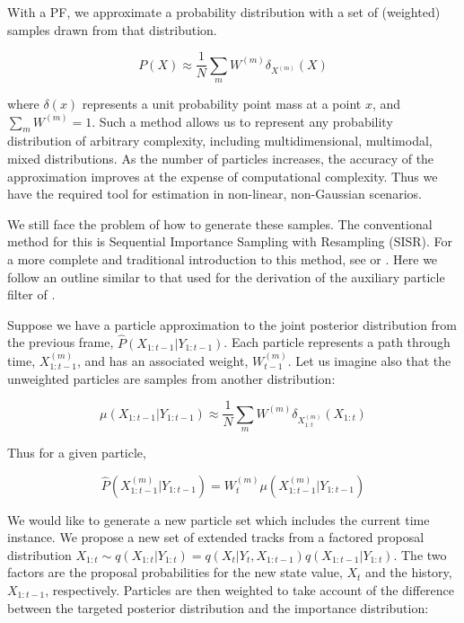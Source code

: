 With a PF, we approximate a probability distribution with a set of (weighted) samples drawn from that distribution.

\begin{equation}
P(X) \approx \frac{1}{N} \sum_m{W^{(m)} \delta_{X^{(m)}} (X)}
\label{eq:ParticleApprox}
\end{equation}

where $\delta (x)$ represents a unit probability point mass at a point $x$, and $\sum_m{W^{(m)}}=1$. Such a method allows us to represent any probability distribution of arbitrary complexity, including multidimensional, multimodal, mixed distributions. As the number of particles increases, the accuracy of the approximation improves at the expense of computational complexity. Thus we have the required tool for estimation in non-linear, non-Gaussian scenarios.

We still face the problem of how to generate these samples. The conventional method for this is Sequential Importance Sampling with Resampling (SISR). For a more complete and traditional introduction to this method, see \cite{Cappe2007} or \cite{Doucet2009}. Here we follow an outline similar to that used for the derivation of the auxiliary particle filter of \cite{Pitt1999}.

Suppose we have a particle approximation to the joint posterior distribution from the previous frame, $\hat{P}(X_{1:t-1}|Y_{1:t-1})$. Each particle represents a path through time, $X_{1:t-1}^{(m)}$, and has an associated weight, $W_{t-1}^{(m)}$. Let us imagine also that the unweighted particles are samples from another distribution:

\begin{equation}
\mu(X_{1:t-1}|Y_{1:t-1}) \approx \frac{1}{N} \sum_m{W^{(m)} \delta_{X_{1:t}^{(m)}} (X_{1:t})}
\label{eq:UnweightParticleDistn}
\end{equation}

Thus for a given particle,

\begin{equation}
\hat{P}(X_{1:t-1}^{(m)}|Y_{1:t-1}) = W_t^{(m)} \mu(X_{1:t-1}^{(m)}|Y_{1:t-1})
\label{eq:}
\end{equation}

We would like to generate a new particle set which includes the current time instance. We propose a new set of extended tracks from a factored proposal distribution $X_{1:t} \sim q(X_{1:t}|Y_{1:t}) = q(X_{t}|Y_{t}, X_{1:t-1}) q(X_{1:t-1}|Y_{1:t})$. The two factors are the proposal probabilities for the new state value, $X_t$ and the history, $X_{1:t-1}$, respectively. Particles are then weighted to take account of the difference between the targeted posterior distribution and the importance distribution:

